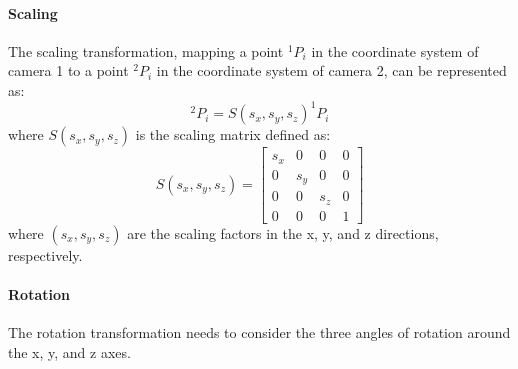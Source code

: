 \paragraph{Scaling}
The scaling transformation, mapping a point \( ^1P_i \) in the coordinate system of camera 1 to a point \( ^2P_i \) in the coordinate system of camera 2, can be represented as:
\[ ^2P_i = S(s_x, s_y, s_z) ^1P_i \]
where \( S(s_x, s_y, s_z) \) is the scaling matrix defined as:
\[ S(s_x, s_y, s_z) = \begin{bmatrix}
    s_x & 0 & 0 & 0 \\
    0 & s_y & 0 & 0 \\
    0 & 0 & s_z & 0 \\
    0 & 0 & 0 & 1
\end{bmatrix} \]
where \( (s_x, s_y, s_z) \) are the scaling factors in the x, y, and z directions, respectively.

\paragraph{Rotation}
The rotation transformation needs to consider the three angles of rotation around the x, y, and z axes.

